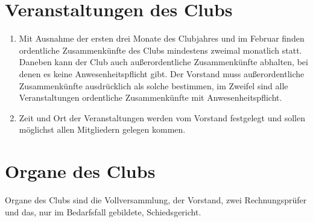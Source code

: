 \documentclass{statutclass}
\begin{document}
\section{Veranstaltungen des Clubs}
\begin{enumerate}
    \item Mit Ausnahme der ersten drei Monate des Clubjahres und im Februar finden ordentliche Zusammenkünfte des Clubs mindestens zweimal monatlich statt. Daneben kann der Club auch außerordentliche Zusammenkünfte abhalten, bei denen es keine Anwesenheitspflicht gibt. Der Vorstand muss außerordentliche Zusammenkünfte ausdrücklich als solche bestimmen, im Zweifel sind alle Veranstaltungen ordentliche Zusammenkünfte mit Anwesenheitspflicht.
    \item Zeit und Ort der Veranstaltungen werden vom Vorstand festgelegt und sollen möglichst allen Mitgliedern gelegen kommen. 
\end{enumerate}

\section{Organe des Clubs}
Organe des Clubs sind die Vollversammlung, der Vorstand, zwei Rechnungsprüfer und das, nur im Bedarfsfall gebildete, Schiedsgericht.
\end{document}
